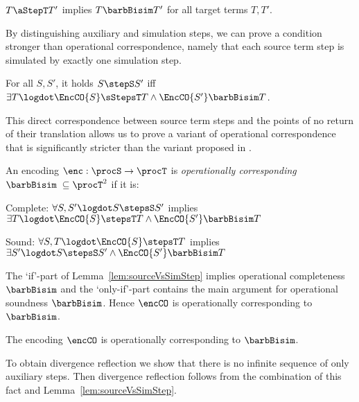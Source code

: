 \documentclass[copyright,creativecommons]{eptcs}
\begin{document}
\begin{lemma}
	$ T \aStepT T' $ implies $ T \barbBisim T' $ for all target terms $ T, T' $.
	\label{lem:auxStepsCentral}
\end{lemma}

By distinguishing auxiliary and simulation steps, we can prove a condition stronger than operational correspondence, namely that each source term step is simulated by exactly one simulation step.

\begin{lemma}
	For all $ S, S' $, it holds $ S \stepS S' $ iff $ \exists T\logdot \EncCO{S} \sStepsT T \wedge \EncCO{S'} \barbBisim T $.
	\label{lem:sourceVsSimStep}
\end{lemma}

\noindent
This direct correspondence between source term steps and the points of no return of their translation allows us to prove a variant of operational correspondence that is significantly stricter than the variant proposed in \cite{gorla10}.

\begin{definition}
	$ $\\
	An encoding $ \enc: \procS \to \procT $ is \emph{operationally corresponding} \wrt $ \barbBisim \; \subseteq \procT^2 $ if it is:
	\begin{compactitem}
		\item[\; Complete:] $ \forall S, S' \logdot S \stepsS S' $ implies $ \exists T \logdot \EncCO{S} \stepsT T \wedge \EncCO{S'} \barbBisim T $
		\item[\; Sound:] $ \forall S, T \logdot \EncCO{S} \stepsT T $ implies $ \exists S' \logdot S \stepsS S' \wedge \EncCO{S'} \barbBisim T $
	\end{compactitem}
\end{definition}

\noindent
The `if'-part of Lemma~\ref{lem:sourceVsSimStep} implies operational completeness \wrt $ \barbBisim $ and the `only-if'-part contains the main argument for operational soundness \wrt $ \barbBisim $. Hence $ \encCO $ is operationally corresponding \wrt to $ \barbBisim $.

\begin{theorem}
	The encoding $ \encCO $ is operationally corresponding \wrt to $ \barbBisim $.
	\label{thm:operationalCorrespondenceCentral}
\end{theorem}

To obtain divergence reflection we show that there is no infinite sequence of only auxiliary steps.
Then divergence reflection follows from the combination of this fact and Lemma~\ref{lem:sourceVsSimStep}.
\end{document}
